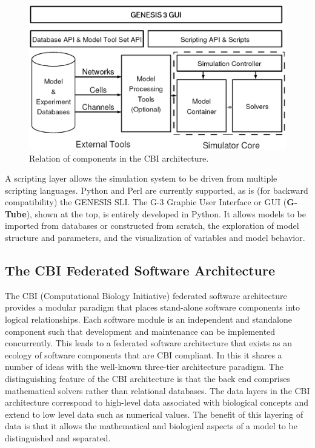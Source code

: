 \documentclass[12pt]{article}
\begin{document}
\begin{figure}[ht]
  \centering
    \includegraphics[scale=0.4]{figures/G3arch.eps}
  \caption{Relation of components in the CBI architecture.}
  \label{fig:cbi-arch}
\end{figure}

A scripting layer allows the simulation system to be driven from
multiple scripting languages. Python and Perl are currently supported, as is (for backward compatibility) the GENESIS SLI. The G-3 Graphic User Interface or GUI ({\bf G-Tube}), shown at the top,
is entirely developed in Python.  It allows models to be imported from
databases or constructed from scratch, the exploration of model
structure and parameters, and the visualization of variables and model
behavior.

\subsection{The CBI Federated Software Architecture}

The CBI (Computational Biology Initiative) federated software architecture
provides a modular paradigm that places stand-alone software
components into logical relationships. Each software module is an independent and standalone component such that development and maintenance can be implemented concurrently. This leads to a federated software architecture that exists as an ecology of software components that are CBI compliant. In this it shares a number of
ideas with the well-known three-tier architecture paradigm.  The
distinguishing feature of the CBI architecture is that the back end
comprises mathematical solvers rather than relational databases.  The
data layers in the CBI architecture correspond to high-level data
associated with biological concepts and extend to low level data such
as numerical values. The benefit of this layering of data is that it
allows the mathematical and biological aspects of a model to be
distinguished and separated.
\end{document}
